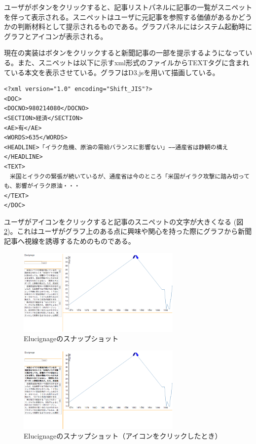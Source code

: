 \documentclass{matsushita-zemi}
\begin{document}
ユーザがボタンをクリックすると、記事リストパネルに記事の一覧がスニペットを伴って表示される。スニペットはユーザに元記事を参照する価値があるかどうかの判断材料として提示されるものである。グラフパネルにはシステム起動時にグラフとアイコンが表示される。

現在の実装はボタンをクリックすると新聞記事の一部を提示するようになっている。また、スニペットは以下に示すxml形式のファイルからTEXTタグに含まれている本文を表示させている。グラフはD3.jsを用いて描画している。
\begin{verbatim}
<?xml version="1.0" encoding="Shift_JIS"?>
<DOC>
<DOCNO>980214080</DOCNO>
<SECTION>経済</SECTION>
<AE>有</AE>
<WORDS>635</WORDS>
<HEADLINE>「イラク危機、原油の需給バランスに影響ない」−−通産省は静観の構え</HEADLINE>
<TEXT>
　米国とイラクの緊張が続いているが、通産省は今のところ「米国がイラク攻撃に踏み切っても、影響がイラク原油・・・
</TEXT>
</DOC>
\end{verbatim}

ユーザがアイコンをクリックすると記事のスニペットの文字が大きくなる (図\ref{Elucignage_click})。これはユーザがグラフ上のある点に興味や関心を持った際にグラフから新聞記事へ視線を誘導するためのものである。

\begin{figure}[tb]
  \begin{center}
   \includegraphics[width=8cm,bb=0 0 852 448]{Elucignageprototype.png}
  \end{center}
 \caption{Elucignageのスナップショット}
 \label{Elucignage}
\end{figure}
\begin{figure}[tb]
  \begin{center}
   \includegraphics[width=8cm,bb=0 0 853 448]{Elucignage_click.png}
  \end{center}
 \caption{Elucignageのスナップショット（アイコンをクリックしたとき）}
 \label{Elucignage_click}
\end{figure}
\end{document}

